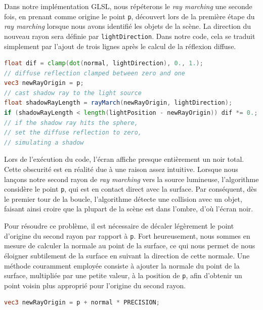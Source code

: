 Dans notre implémentation GLSL, nous répéterons le \textit{ray marching} une seconde fois, en prenant comme origine le point \lstinline{p}, découvert lors de la première étape du \textit{ray marching} lorsque nous avons identifié les objets de la scène. La direction du nouveau rayon sera définie par \lstinline{lightDirection}. Dans notre code, cela se traduit simplement par l'ajout de trois lignes après le calcul de la réflexion diffuse.

\begin{minipage}{\linewidth}
\begin{lstlisting}[language=GLSL, caption=Calcul des ombres,captionpos=b,frame=single]
float dif = clamp(dot(normal, lightDirection), 0., 1.); 
// diffuse reflection clamped between zero and one
vec3 newRayOrigin = p;
// cast shadow ray to the light source
float shadowRayLength = rayMarch(newRayOrigin, lightDirection); 
if (shadowRayLength < length(lightPosition - newRayOrigin)) dif *= 0.; 
// if the shadow ray hits the sphere,
// set the diffuse reflection to zero,
// simulating a shadow
\end{lstlisting}
\end{minipage}

Lors de l'exécution du code, l'écran affiche presque entièrement un noir total. Cette obscurité est en réalité due à une raison assez intuitive. Lorsque nous lançons notre second rayon de \textit{ray marching} vers la source lumineuse, l'algorithme considère le point \lstinline{p}, qui est en contact direct avec la surface. Par conséquent, dès le premier tour de la boucle, l'algorithme détecte une collision avec un objet, faisant ainsi croire que la plupart de la scène est dans l'ombre, d'où l'écran noir.

Pour résoudre ce problème, il est nécessaire de décaler légèrement le point d'origine du second rayon par rapport à \lstinline{p}. Fort heureusement, nous sommes en mesure de calculer la normale au point de la surface, ce qui nous permet de nous éloigner subtilement de la surface en suivant la direction de cette normale. Une méthode couramment employée consiste à ajouter la normale du point de la surface, multipliée par une petite valeur, à la position de \lstinline{p}, afin d'obtenir un point voisin plus approprié pour l'origine du second rayon.

\begin{minipage}{\linewidth}
\begin{lstlisting}[language=GLSL, caption=S'éloigner de la surface,captionpos=b,frame=single]
vec3 newRayOrigin = p + normal * PRECISION;
\end{lstlisting}
\end{minipage}

